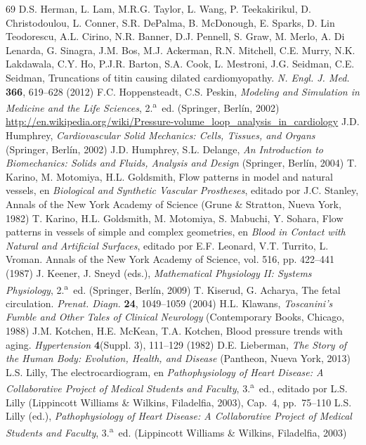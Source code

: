 \documentclass[12pt]{book}
\begin{document}
\begin{thebibliography}{69}
 D.S. Herman, L. Lam, M.R.G. Taylor, L. Wang, P. Teekakirikul, D. Christodoulou, L. Conner, S.R. DePalma, B. McDonough, E. Sparks, D. Lin Teodorescu, A.L. Cirino, N.R. Banner, D.J. Pennell, S. Graw, M. Merlo, A. Di Lenarda, G. Sinagra, J.M. Bos, M.J. Ackerman, R.N. Mitchell, C.E. Murry, N.K. Lakdawala, C.Y. Ho, P.J.R. Barton, S.A. Cook, L. Mestroni, J.G. Seidman, C.E. Seidman, Truncations of titin causing dilated cardiomyopathy. \textit{N. Engl. J. Med.} \textbf{366}, 619--628 (2012)
 F.C. Hoppensteadt, C.S. Peskin, \textit{Modeling and Simulation in Medicine and the Life Sciences}, 2.\textsuperscript{a}~ed. (Springer, Berlín, 2002)
 \url{http://en.wikipedia.org/wiki/Pressure-volume_loop_analysis_in_cardiology}
 J.D. Humphrey, \textit{Cardiovascular Solid Mechanics: Cells, Tissues, and Organs} (Springer, Berlín, 2002)
 J.D. Humphrey, S.L. Delange, \textit{An Introduction to Biomechanics: Solids and Fluids, Analysis and Design} (Springer, Berlín, 2004)
 T. Karino, M. Motomiya, H.L. Goldsmith, Flow patterns in model and natural vessels, en \textit{Biological and Synthetic Vascular Prostheses}, editado por J.C. Stanley, Annals of the New York Academy of Science (Grune \& Stratton, Nueva York, 1982)
 T. Karino, H.L. Goldsmith, M. Motomiya, S. Mabuchi, Y. Sohara, Flow patterns in vessels of simple and complex geometries, en \textit{Blood in Contact with Natural and Artificial Surfaces}, editado por E.F. Leonard, V.T. Turrito, L. Vroman. Annals of the New York Academy of Science, vol. 516, pp. 422--441 (1987)
 J. Keener, J. Sneyd (eds.), \textit{Mathematical Physiology II: Systems Physiology}, 2.\textsuperscript{a}~ed. (Springer, Berlín, 2009)
 T. Kiserud, G. Acharya, The fetal circulation. \textit{Prenat. Diagn.} \textbf{24}, 1049--1059 (2004)
 H.L. Klawans, \textit{Toscanini's Fumble and Other Tales of Clinical Neurology} (Contemporary Books, Chicago, 1988)
 J.M. Kotchen, H.E. McKean, T.A. Kotchen, Blood pressure trends with aging. \textit{Hypertension} \textbf{4}(Suppl. 3), 111--129 (1982)
 D.E. Lieberman, \textit{The Story of the Human Body: Evolution, Health, and Disease} (Pantheon, Nueva York, 2013)
 L.S. Lilly, The electrocardiogram, en \textit{Pathophysiology of Heart Disease: A Collaborative Project of Medical Students and Faculty}, 3.\textsuperscript{a}~ed., editado por L.S. Lilly (Lippincott Williams \& Wilkins, Filadelfia, 2003), Cap.~4, pp.~75--110
 L.S. Lilly (ed.), \textit{Pathophysiology of Heart Disease: A Collaborative Project of Medical Students and Faculty}, 3.\textsuperscript{a}~ed. (Lippincott Williams \& Wilkins, Filadelfia, 2003)

\end{thebibliography}
\end{document}
